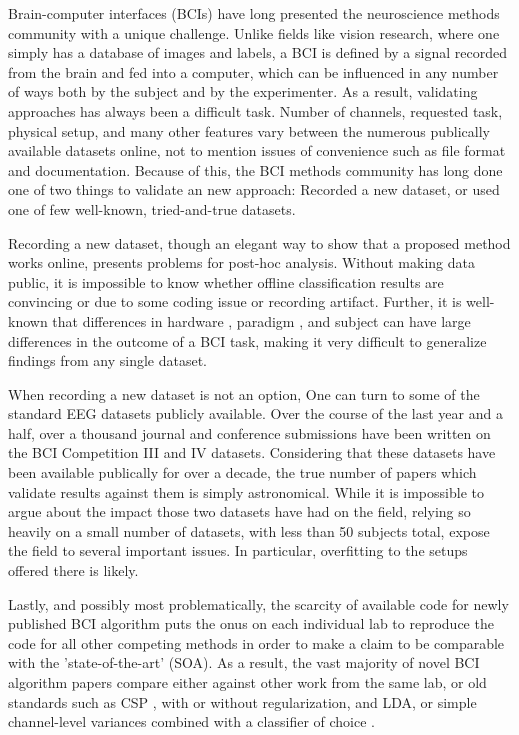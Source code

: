 Brain-computer interfaces (BCIs) have long presented the neuroscience methods
community with a unique challenge. Unlike fields like vision research, where one
simply has a database of images and labels, a BCI is defined by a signal
recorded from the brain and fed into a computer, which can be influenced in any
number of ways both by the subject and by the experimenter. As a result,
validating approaches has always been a difficult task. Number of channels,
requested task, physical setup, and many other features vary between the
numerous publically available datasets online, not to mention issues of
convenience such as file format and documentation. Because of this, the BCI
methods community has long done one of two things to validate an new approach:
Recorded a new dataset, or used one of few well-known, tried-and-true datasets.

Recording a new dataset, though an elegant way to show that a proposed
method works online, presents problems for post-hoc analysis. Without
making data public, it is impossible to know whether offline
classification results are convincing or due to some coding issue or
recording artifact. Further, it is well-known that differences in
hardware \cite{Searle2000,Lopez-Gordo2014}, paradigm \cite{Allison2010}, and
subject \cite{Allison2010} can have large differences in the
outcome of a BCI task, making it very difficult to generalize findings
from any single dataset.

When recording a new dataset is not an option, One can turn to some of
the standard EEG datasets publicly available. Over the course of the
last year and a half, over a thousand journal and conference
submissions have been written on the BCI Competition III
\cite{Blankertz2006,Schloegl2005} and IV \cite{Tangermann2012}
datasets. Considering that these datasets have been available
publically for over a decade, the true number of papers which validate
results against them is simply astronomical. While it is impossible to
argue about the impact those two datasets have had on the field,
relying so heavily on a small number of datasets, with less than 50
subjects total, expose the field to several important issues. In
particular, overfitting to the setups offered there is likely.

Lastly, and possibly most problematically, the scarcity of available
code for newly published BCI algorithm puts the onus on each
individual lab to reproduce the code for all other competing methods
in order to make a claim to be comparable with the 'state-of-the-art'
(SOA). As a result, the vast majority of novel BCI algorithm papers
compare either against other work from the same lab, or old standards
such as CSP \cite{Koles1990},
with or without regularization, and LDA, or simple channel-level
variances combined with a classifier of choice \cite{Garrett2003} .

